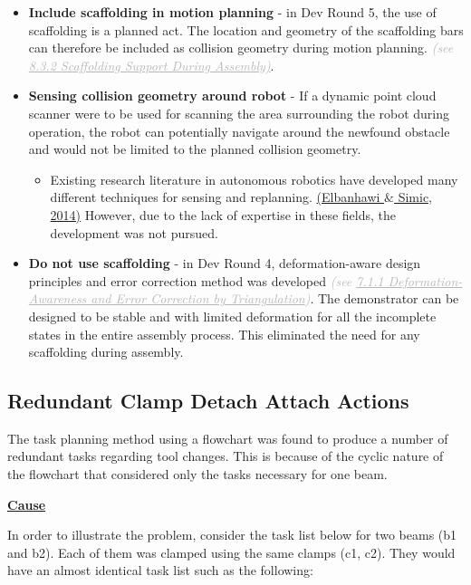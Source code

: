 \begin{itemize}
	\item \textbf{Include scaffolding in motion planning }- in Dev Round 5, the use of scaffolding is a planned act. The location and geometry of the scaffolding bars can therefore be included as collision geometry during motion planning. \textit{\textcolor[HTML]{B7B7B7}{(see \uline{8.3.2 Scaffolding Support During Assembly)}}}.

	\item \textbf{Sensing collision geometry around robot }- If a dynamic point cloud scanner were to be used for scanning the area surrounding the robot during operation, the robot can potentially navigate around the newfound obstacle and would not be limited to the planned collision geometry. 

\begin{itemize}
	\item Existing research literature in autonomous robotics have developed many different techniques for sensing and replanning. \href{https://www.zotero.org/google-docs/?7DB2Nw}{(Elbanhawi $\&$ Simic, 2014)} However, due to the lack of expertise in these fields, the development was not pursued.

\end{itemize}
	\item \textbf{Do not use scaffolding }- in Dev Round 4, deformation-aware design principles and error correction method was developed \textit{\textcolor[HTML]{B7B7B7}{(see \uline{7.1.1 Deformation-Awareness and Error Correction by Triangulation})}}. The demonstrator can be designed to be stable and with limited deformation for all the incomplete states in the entire assembly process. This eliminated the need for any scaffolding during assembly. 

\end{itemize}
\subsection{Redundant Clamp Detach Attach Actions}

The task planning method using a flowchart was found to produce a number of redundant tasks regarding tool changes. This is because of the cyclic nature of the flowchart that considered only the tasks necessary for one beam. 

\textbf{\uline{Cause}}

In order to illustrate the problem, consider the task list below for two beams (b1 and b2). Each of them was clamped using the same clamps (c1, c2). They would have an almost identical task list such as the following:

